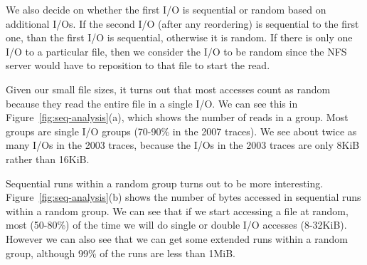 We also decide on whether the first I/O is sequential or random based
on additional I/Os.  If the second I/O (after any reordering) is
sequential to the first one, than the first I/O is sequential,
otherwise it is random.  If there is only one I/O to a particular
file, then we consider the I/O to be random since the NFS server would
have to reposition to that file to start the read.  

Given our small file sizes, it turns out that most accesses count as
random because they read the entire file in a single I/O.  We can see
this in Figure~\ref{fig:seq-analysis}(a), which shows the number of
reads in a group.  Most groups are single I/O groups (70-90\% in the
2007 traces).  We see about twice as many I/Os in the 2003 traces,
because the I/Os in the 2003 traces are only 8KiB rather than 16KiB.

Sequential runs within a random group turns out to be more
interesting.  Figure~\ref{fig:seq-analysis}(b) shows the number of
bytes accessed in sequential runs within a
random group.  We can see that if we start accessing a file at random,
most (50-80\%) of the time we will do single or double I/O accesses (8-32KiB).
However we can also see that we can get some extended runs within a
random group, although 99\% of the runs are less than 1MiB.


